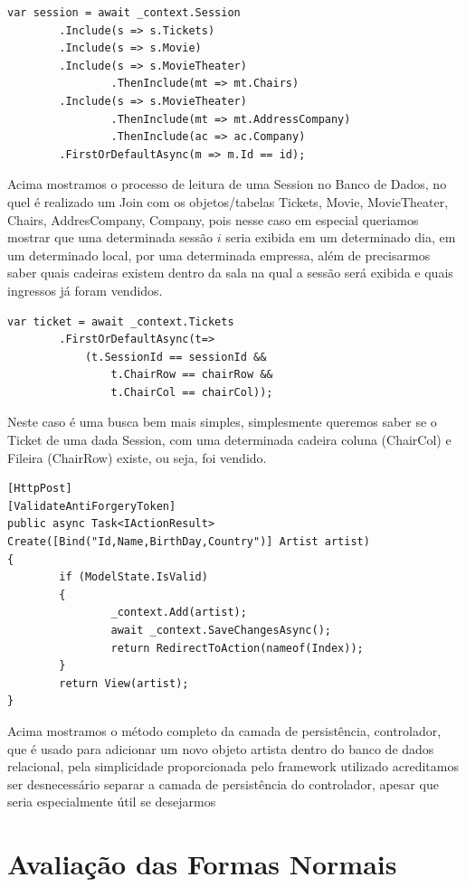 \documentclass[a4paper,10pt]{article}
\begin{document}
\begin{lstlisting}
var session = await _context.Session
		.Include(s => s.Tickets)
		.Include(s => s.Movie)
		.Include(s => s.MovieTheater)
				.ThenInclude(mt => mt.Chairs)
		.Include(s => s.MovieTheater)
				.ThenInclude(mt => mt.AddressCompany)
				.ThenInclude(ac => ac.Company)
		.FirstOrDefaultAsync(m => m.Id == id);
\end{lstlisting}

Acima mostramos o processo de leitura de uma Session no Banco de Dados, no quel é realizado um Join com os objetos/tabelas Tickets, Movie, MovieTheater, Chairs, AddresCompany, Company, pois nesse caso em especial queriamos mostrar que uma determinada sessão $i$ seria exibida em um determinado dia, em um determinado local, por uma determinada empressa, além de precisarmos saber quais cadeiras existem dentro da sala na qual a sessão será exibida e quais ingressos já foram vendidos.

\begin{lstlisting}
var ticket = await _context.Tickets
		.FirstOrDefaultAsync(t=> 
			(t.SessionId == sessionId && 
				t.ChairRow == chairRow && 
				t.ChairCol == chairCol));
\end{lstlisting}

Neste caso é uma busca bem mais simples, simplesmente queremos saber se o Ticket de uma dada Session, com uma determinada cadeira coluna (ChairCol) e Fileira (ChairRow) existe, ou seja, foi vendido.

\begin{lstlisting}
[HttpPost]
[ValidateAntiForgeryToken]
public async Task<IActionResult> Create([Bind("Id,Name,BirthDay,Country")] Artist artist)
{
		if (ModelState.IsValid)
		{
				_context.Add(artist);
				await _context.SaveChangesAsync();
				return RedirectToAction(nameof(Index));
		}
		return View(artist);
}
\end{lstlisting}
Acima mostramos o método completo da camada de persistência, controlador, que é usado para adicionar um novo objeto artista dentro do banco de dados relacional, pela simplicidade proporcionada pelo framework utilizado acreditamos ser desnecessário separar a camada de persistência do controlador, apesar que seria especialmente útil se desejarmos 

\section{Avaliação das Formas Normais}

%
% 
\end{document}
